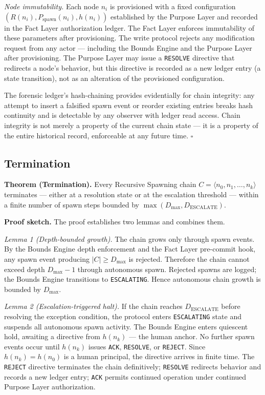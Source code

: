 \medskip
\textit{Node immutability.} Each node $n_i$ is provisioned with a fixed configuration $(R(n_i), P_{\mathrm{spawn}}(n_i), h(n_i))$ established by the Purpose Layer and recorded in the Fact Layer authorization ledger. The Fact Layer enforces immutability of these parameters after provisioning. The write protocol rejects any modification request from any actor — including the Bounds Engine and the Purpose Layer after provisioning. The Purpose Layer may issue a \texttt{RESOLVE} directive that redirects a node's behavior, but this directive is recorded as a new ledger entry (a state transition), not as an alteration of the provisioned configuration.

The forensic ledger's hash-chaining provides evidentially for chain integrity: any attempt to insert a falsified spawn event or reorder existing entries breaks hash continuity and is detectable by any observer with ledger read access. Chain integrity is not merely a property of the current chain state — it is a property of the entire historical record, enforceable at any future time. $\square$

\subsection{Termination}
\label{sec:rs-termination-proof}

\medskip
\noindent\textbf{Theorem (Termination).} Every Recursive Spawning chain $C = \langle n_0, n_1, \ldots, n_k \rangle$ terminates — either at a resolution state or at the escalation threshold — within a finite number of spawn steps bounded by $\max(D_{\mathrm{max}}, D_{\mathrm{ESCALATE}})$.

\medskip
\noindent\textbf{Proof sketch.} The proof establishes two lemmas and combines them.

\medskip
\textit{Lemma 1 (Depth-bounded growth).} The chain grows only through spawn events. By the Bounds Engine depth enforcement and the Fact Layer pre-commit hook, any spawn event producing $|C| \geq D_{\mathrm{max}}$ is rejected. Therefore the chain cannot exceed depth $D_{\mathrm{max}} - 1$ through autonomous spawn. Rejected spawns are logged; the Bounds Engine transitions to \texttt{ESCALATING}. Hence autonomous chain growth is bounded by $D_{\mathrm{max}}$.

\medskip
\textit{Lemma 2 (Escalation-triggered halt).} If the chain reaches $D_{\mathrm{ESCALATE}}$ before resolving the exception condition, the protocol enters \texttt{ESCALATING} state and suspends all autonomous spawn activity. The Bounds Engine enters quiescent hold, awaiting a directive from $h(n_k)$ — the human anchor. No further spawn events occur until $h(n_k)$ issues \texttt{ACK}, \texttt{RESOLVE}, or \texttt{REJECT}. Since $h(n_k) = h(n_0)$ is a human principal, the directive arrives in finite time. The \texttt{REJECT} directive terminates the chain definitively; \texttt{RESOLVE} redirects behavior and records a new ledger entry; \texttt{ACK} permits continued operation under continued Purpose Layer authorization.

